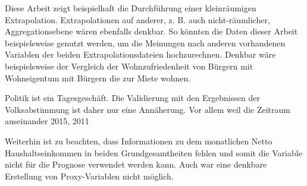 \documentclass{Vorlage}
\begin{document}
Diese Arbeit zeigt beispielhaft die Durchführung einer kleinräumigen Extrapolation. Extrapolationen auf anderer, z. B. auch nicht-räumlicher, Aggregationsebene wären ebenfalls denkbar. So könnten die Daten dieser Arbeit beispielsweise genutzt werden, um die Meinungen nach anderen vorhandenen Variablen der beiden Extrapolationsdateien hochzurechnen. Denkbar wäre beispielsweise der Vergleich der Wohnzufriedenheit von Bürgern mit Wohneigentum mit Bürgern die zur Miete wohnen.

Politik ist ein Tagesgeschäft. Die Validierung mit den Ergebnissen der Volksabstimmung ist daher nur eine Annäherung. Vor allem weil die Zeitraum auseinander 2015, 2011

Weiterhin ist zu beachten, dass Informationen zu dem monatlichen Netto Haushaltseinkommen in beiden Grundgesamtheiten fehlen und somit die Variable nicht für die Prognose verwendet werden kann. Auch war eine denkbare Erstellung von Proxy-Variablen nicht möglich.

\clearpage



 





\clearpage

\end{document}
